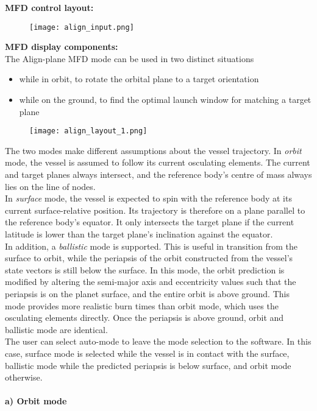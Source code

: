 \documentclass[Orbiter User Manual.tex]{subfiles}
\begin{document}
\noindent
\textbf{MFD control layout:}

\begin{figure}[H]
  \centering
  \texttt{[image: align\_input.png]}
\end{figure}

\noindent
\textbf{MFD display components:}\\
The Align-plane MFD mode can be used in two distinct situations

\begin{itemize}
\item while in orbit, to rotate the orbital plane to a target orientation
\item while on the ground, to find the optimal launch window for matching a target plane
\end{itemize}

\begin{figure}[H]
  \centering
  \texttt{[image: align\_layout\_1.png]}
\end{figure}

\noindent
The two modes make different assumptions about the vessel trajectory. In \textit{orbit} mode, the vessel is assumed to follow its current osculating elements. The current and target planes always intersect, and the reference body's centre of mass always lies on the line of nodes.\\
In \textit{surface} mode, the vessel is expected to spin with the reference body at its current surface-relative position. Its trajectory is therefore on a plane parallel to the reference body's equator. It only intersects the target plane if the current latitude is lower than the target plane's inclination against the equator.\\
In addition, a \textit{ballistic} mode is supported. This is useful in transition from the surface to orbit, while the periapsis of the orbit constructed from the vessel's state vectors is still below the surface. In this mode, the orbit prediction is modified by altering the semi-major axis and eccentricity values such that the periapsis is on the planet surface, and the entire orbit is above ground. This mode provides more realistic burn times than orbit mode, which uses the osculating elements directly. Once the periapsis is above ground, orbit and ballistic mode are identical.\\
The user can select auto-mode to leave the mode selection to the software. In this case, surface mode is selected while the vessel is in contact with the surface, ballistic mode while the predicted periapsis is below surface, and orbit mode otherwise.\\
\\
\textbf{a) Orbit mode}
\end{document}
